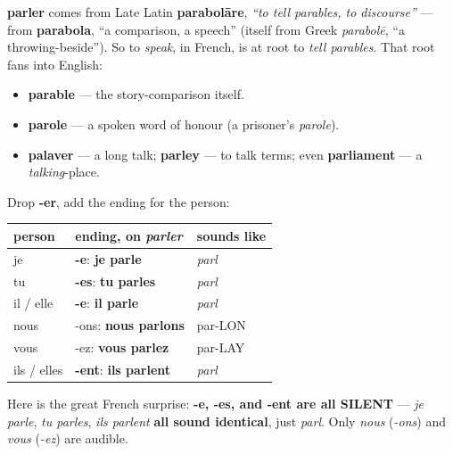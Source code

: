 \begin{cousinweb}
\textbf{parler} comes from Late Latin \textbf{parabolāre}, \emph{\textquotedblleft{}to tell parables, to discourse\textquotedblright{}} — from \textbf{parabola}, \textquotedblleft{}a comparison, a speech\textquotedblright{} (itself from Greek \emph{parabolē}, \textquotedblleft{}a throwing-beside\textquotedblright{}). So to \emph{speak}, in French, is at root to \emph{tell parables}. That root fans into English:

\begin{itemize}
\raggedright
  \item \textbf{parable} — the story-comparison itself.
  \item \textbf{parole} — a spoken word of honour (a prisoner's \emph{parole}).
  \item \textbf{palaver} — a long talk; \textbf{parley} — to talk terms; even \textbf{parliament} — a \emph{talking}-place.
\end{itemize}
\end{cousinweb}

\begin{grammarlens}[title={Grammar Lens: the -er present tense (and its silent trap)}]
Drop \textbf{-er}, add the ending for the person:

\noindent
\begin{tabularx}{\linewidth}{@{}>{\raggedright\arraybackslash}X>{\raggedright\arraybackslash}X>{\raggedright\arraybackslash}X@{}}
\toprule
\textbf{person} & \textbf{ending, on \emph{parler}} & \textbf{sounds like} \\
\midrule
je & \textbf{-e}: \textbf{je parle} & \emph{parl} \\
tu & \textbf{-es}: \textbf{tu parles} & \emph{parl} \\
il / elle & \textbf{-e}: \textbf{il parle} & \emph{parl} \\
nous & -ons: \textbf{nous parlons} & par-LON \\
vous & -ez: \textbf{vous parlez} & par-LAY \\
ils / elles & \textbf{-ent}: \textbf{ils parlent} & \emph{parl} \\
\bottomrule
\end{tabularx}

Here is the great French surprise: \textbf{-e, -es, and -ent are all SILENT} — \emph{je parle}, \emph{tu parles}, \emph{ils parlent} \textbf{all sound identical}, just \emph{parl}. Only \emph{nous} (\emph{-ons}) and \emph{vous} (\emph{-ez}) are audible.
\end{grammarlens}

